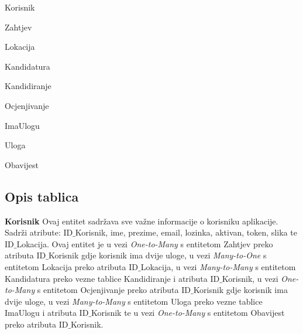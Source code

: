 		\begin{packed_item}
			\item Korisnik
			\item Zahtjev
			\item Lokacija
			\item Kandidatura
			\item Kandidiranje
			\item Ocjenjivanje
			\item ImaUlogu 
			\item Uloga
			\item Obavijest
			
		\end{packed_item}
		
			\subsection{Opis tablica}
			
					    \textbf{ Korisnik}
		    \text Ovaj entitet sadržava sve važne informacije o korisniku aplikacije. Sadrži atribute: ID${\_}$Korisnik, ime, prezime, email, lozinka, aktivan, token, slika te ID${\_}$Lokacija. Ovaj entitet je u vezi \emph{One-to-Many} s entitetom Zahtjev preko atributa ID${\_}$Korisnik gdje korisnik ima dvije uloge, u vezi  \emph{Many-to-One} s entitetom Lokacija preko atributa ID${\_}$Lokacija, u vezi \emph{Many-to-Many} s entitetom Kandidatura preko vezne tablice Kandidiranje i atributa ID${\_}$Korisnik, u vezi \emph{One-to-Many} s entitetom Ocjenjivanje preko atributa ID${\_}$Korisnik gdje korisnik ima dvije uloge, u vezi \emph{Many-to-Many} s entitetom Uloga preko vezne tablice ImaUlogu i atributa ID${\_}$Korisnik te u vezi \emph{One-to-Many} s entitetom Obavijest preko atributa ID${\_}$Korisnik.
				

